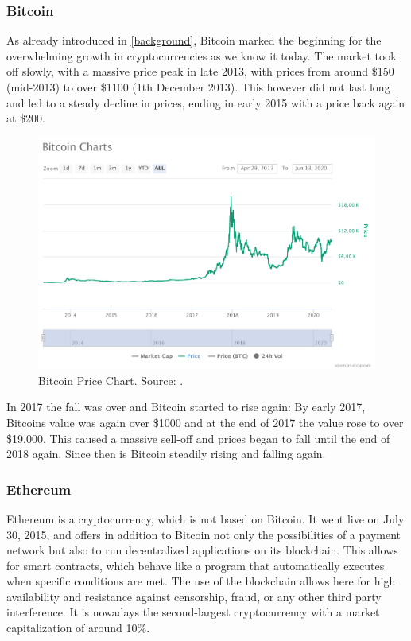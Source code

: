 \documentclass[11pt,a4paper,compsoc,conference]{IEEEtran}
\begin{document}
\subsubsection{Bitcoin}

As already introduced in \autoref{background}, Bitcoin marked the beginning for the overwhelming growth in cryptocurrencies as we know it today. The market took off slowly, with a massive price peak in late 2013, with prices from around \$150  (mid-2013) to over \$1100  (1th December 2013). This however did not last long and led to a steady decline in prices, ending in early 2015 with a price back again at \$200.

\begin{figure}[H]
    \centering
    \includegraphics[width=\linewidth]{figures/Bitcoin-charts.pdf}
    \caption[Bitcoin Price Chart]{Bitcoin Price Chart. Source: \citep{coinmarketcap}. }
    \label{fig:Bitcoin}
\end{figure}

In 2017 the fall was over and Bitcoin started to rise again: By early 2017, Bitcoins value was again over \$1000  and at the end of 2017 the value rose to over \$19,000. This caused a massive sell-off and prices began to fall until the end of 2018 again. Since then is Bitcoin steadily rising and falling again.   

\subsubsection{Ethereum}
Ethereum is a cryptocurrency, which is not based on Bitcoin. It went live on July 30, 2015, and offers in addition to Bitcoin not only the possibilities of a payment network but also to run decentralized applications on its blockchain. This allows for smart contracts, which behave like a program that automatically executes when specific conditions are met. The use of the blockchain allows here for high availability and resistance against censorship, fraud, or any other third party interference. It is nowadays the second-largest cryptocurrency with a market capitalization of around 10\%.
\end{document}
